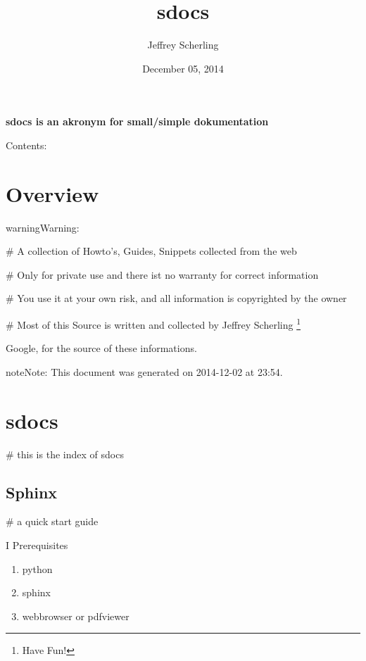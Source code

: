 \documentclass[letterpaper,10pt,english]{sphinxmanual}
\title{sdocs}
\date{December 05, 2014}
\author{Jeffrey Scherling}
\begin{document}
\maketitle
\tableofcontents
{}\label{index::doc}


\textbf{sdocs is an akronym for small/simple dokumentation}

Contents:


\chapter{Overview}
\label{sdocs/overview:overview}\label{sdocs/overview:welcome-to-sdocs}\label{sdocs/overview::doc}
\begin{notice}{warning}{Warning:}
\begin{DUlineblock}{0em}
\item[] \# A collection of Howto's, Guides, Snippets collected from the web
\item[] \# Only for private use and there ist no warranty for correct information
\item[] \# You use it at your own risk, and all information is copyrighted by the owner
\item[] \# Most of this Source is written and collected by Jeffrey Scherling \footnote{
Have Fun!
}
\end{DUlineblock}
\end{notice}




Google, for the source of these informations.



\begin{notice}{note}{Note:}
This document was generated on 2014-12-02 at 23:54.
\end{notice}


\chapter{sdocs}
\label{sdocs/index_sdocs::doc}\label{sdocs/index_sdocs:sdocs}
\# this is the index of sdocs


\section{Sphinx}
\label{sdocs/sphinx/sphinx:sphinx}\label{sdocs/sphinx/sphinx::doc}
\# a quick start guide

I Prerequisites
\begin{enumerate}
\item {} 
python

\item {} 
sphinx

\item {} 
webbrowser or pdfviewer

\end{enumerate}
\end{document}
